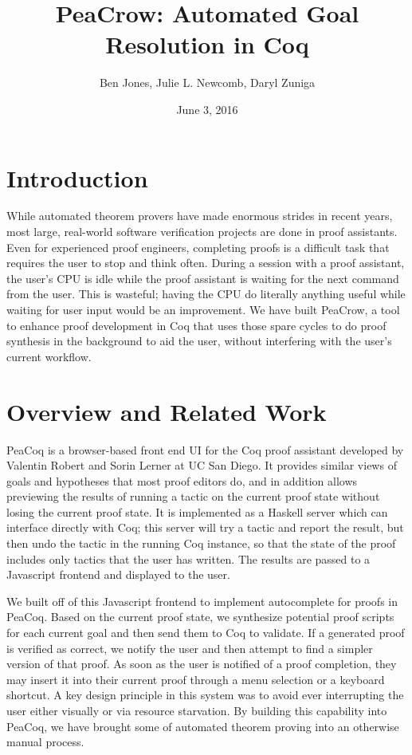 \documentclass{article}
\title{PeaCrow: Automated Goal Resolution in Coq}
\author{Ben Jones, Julie L. Newcomb, Daryl Zuniga}
\date{June 3, 2016}
\begin{document}
\maketitle

\section{Introduction}
While automated theorem provers have made enormous strides in recent years, most large, real-world software verification projects are done in proof assistants. Even for experienced proof engineers, completing proofs is a difficult task that requires the user to stop and think often. During a session with a proof assistant, the user’s CPU is idle while the proof assistant is waiting for the next command from the user. This is wasteful; having the CPU do literally anything useful while waiting for user input would be an improvement. We have built PeaCrow, a tool to enhance proof development in Coq that uses those spare cycles to do proof synthesis in the background to aid the user, without interfering with the user’s current workflow.

\section{Overview and Related Work}
PeaCoq is a browser-based front end UI for the Coq proof assistant developed by Valentin Robert and Sorin Lerner at UC San Diego.\cite{peacoq} It provides similar views of goals and hypotheses that most proof editors do, and in addition allows previewing the results of running a tactic on the current proof state without losing the current proof state. It is implemented as a Haskell server which can interface directly with Coq; this server will try a tactic and report the result, but then undo the tactic in the running Coq instance, so that the state of the proof includes only tactics that the user has written. The results are passed to a Javascript frontend and displayed to the user.

We built off of this Javascript frontend to implement autocomplete for proofs in PeaCoq. Based on the current proof state, we synthesize potential proof scripts for each current goal and then send them to Coq to validate. If a generated proof is verified as correct, we notify the user and then attempt to find a simpler version of that proof. As soon as the user is notified of a proof completion, they may insert it into their current proof through a menu selection or a keyboard shortcut. A key design principle in this system was to avoid ever interrupting the user either visually or via resource starvation. By building this capability into PeaCoq, we have brought some of automated theorem proving into an otherwise manual process.
\end{document}
